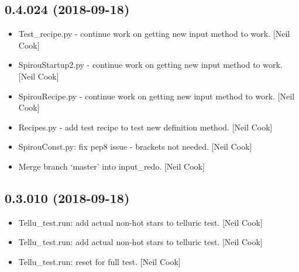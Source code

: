 \documentclass[a4paper,10pt,english]{report}
\begin{document}
\subsection{0.4.024 (2018-09-18)}
\label{\detokenize{misc/changelog:id319}}\begin{itemize}
\item {} 
Test\_recipe.py - continue work on getting new input method to work.
{[}Neil Cook{]}

\item {} 
SpirouStartup2.py - continue work on getting new input method to work.
{[}Neil Cook{]}

\item {} 
SpirouRecipe.py - continue work on getting new input method to work.
{[}Neil Cook{]}

\item {} 
Recipes.py - add test recipe to test new definition method. {[}Neil
Cook{]}

\item {} 
SpirouConst.py: fix pep8 issue - brackets not needed. {[}Neil Cook{]}

\item {} 
Merge branch ‘master’ into input\_redo. {[}Neil Cook{]}

\end{itemize}


\subsection{0.3.010 (2018-09-18)}
\label{\detokenize{misc/changelog:id320}}\begin{itemize}
\item {} 
Tellu\_test.run: add actual non-hot stars to telluric test. {[}Neil Cook{]}

\item {} 
Tellu\_test.run: add actual non-hot stars to telluric test. {[}Neil Cook{]}

\item {} 
Tellu\_test.run: reset for full test. {[}Neil Cook{]}

\end{itemize}
\end{document}
